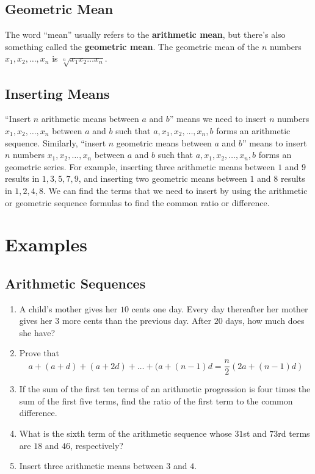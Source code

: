 \documentclass{article}
\begin{document}
    \subsection*{Geometric Mean}
    The word ``mean'' usually refers to the \textbf{arithmetic mean}, but
    there's also something called the \textbf{geometric mean}. The geometric
    mean of the $n$ numbers $x_1, x_2, \dots, x_n$ is $\sqrt[n]{x_1 x_2 \dots
    x_n}$.

    \subsection*{Inserting Means}
    ``Insert $n$ arithmetic means between $a$ and $b$'' means we need to insert $n$
    numbers $x_1, x_2, \dots, x_n$ between $a$ and $b$ such that $a, x_1, x_2,
    \dots, x_n, b$ forms an arithmetic sequence. Similarly, ``insert $n$
    geometric means between $a$ and $b$'' means to insert $n$ numbers $x_1, x_2,
    \dots, x_n$ between $a$ and $b$ such that $a, x_1, x_2, \dots, x_n, b$ forms
    an geometric series. For example, inserting three arithmetic means between
    $1$ and $9$ results in $1, 3, 5, 7, 9$, and inserting two geometric
    means between $1$ and $8$ results in $1, 2, 4, 8$. We can find the terms
    that we need to insert by using the arithmetic or geometric sequence
    formulas to find the common ratio or difference.

    \section*{Examples}
    \subsection*{Arithmetic Sequences}
    \begin{enumerate}
        \item A child’s mother gives her $10$ cents one day. Every day
        thereafter her mother gives her $3$ more cents than the previous day.
        After $20$ days, how much does she have?
        \vspace{3cm}
        \item Prove that
        \[a + (a + d) + (a + 2d) + \dots + (a + (n - 1)d = \frac{n}{2}(2a + (n -
        1)d)\]
        \vspace{3cm}
        \item If the sum of the first ten terms of an arithmetic progression is
        four times the sum of the first five terms, find the ratio of the first
        term to the common difference.
        \vspace{3cm}
        \item What is the sixth term of the arithmetic sequence whose $31$st and
        $73$rd terms are $18$ and $46$, respectively?
        \vspace{3cm}
        \item Insert three arithmetic means between $3$ and $4$.
        \vspace{3cm}
    \end{enumerate}
\end{document}
